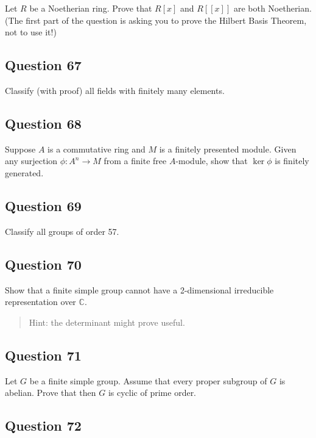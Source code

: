 \documentclass[12pt]{article}
\begin{document}
Let \(R\) be a Noetherian ring. Prove that \(R[x]\) and \(R[[x]]\) are
both Noetherian. (The first part of the question is asking you to prove
the Hilbert Basis Theorem, not to use it!)

\hypertarget{question-67}{%
\subsection{Question 67}\label{question-67}}

Classify (with proof) all fields with finitely many elements.

\hypertarget{question-68}{%
\subsection{Question 68}\label{question-68}}

Suppose \(A\) is a commutative ring and \(M\) is a finitely presented
module. Given any surjection \(\phi:A^n\rightarrow M\) from a finite
free \(A\)-module, show that \(\ker\phi\) is finitely generated.

\hypertarget{question-69}{%
\subsection{Question 69}\label{question-69}}

Classify all groups of order 57.

\hypertarget{question-70}{%
\subsection{Question 70}\label{question-70}}

Show that a finite simple group cannot have a 2-dimensional irreducible
representation over \(\mathbb C\).

\begin{quote}
Hint: the determinant might prove useful.
\end{quote}

\hypertarget{question-71}{%
\subsection{Question 71}\label{question-71}}

Let \(G\) be a finite simple group. Assume that every proper subgroup of
\(G\) is abelian. Prove that then \(G\) is cyclic of prime order.

\hypertarget{question-72}{%
\subsection{Question 72}\label{question-72}}
\end{document}
